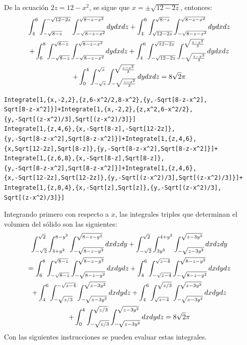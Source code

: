De la ecuación $2z=12-x^2 $, se sigue que $x=\pm \sqrt{12-2z}$,
entonces:
\begin{gather}
\int_{4}^{6}\int_{-\sqrt{8-z}}^{-\sqrt{12-2z}}\int_{-\sqrt{8-z-x^2}}^{\sqrt{8-z-x^2}}dydxdz +\int_{4}^{6}\int_{\sqrt{12-2z}}^{\sqrt{8-z}}\int_{-\sqrt{8-z-x^2}}^{\sqrt{8-z-x^2}}dydxdz \notag \\
+\int_{6}^{8}\int_{-\sqrt{8-z}}^{\sqrt{8-z}}\int_{-\sqrt{8-z-x^2}}^{\sqrt{8-z-x^2}}dydxdz + \int_{4}^{6}\int_{-\sqrt{12-2z}}^{\sqrt{12-2z}}\int_{-\sqrt{\frac{z-x^2 }{3}} }^{\sqrt{\frac{z-x^2 }{3}}}dydxdz \notag \\
+\int_{0}^{4}\int_{-\sqrt{z}}^{\sqrt{z}}\int_{-\sqrt{\frac{z-x^2 }{3}}}^{\sqrt{\frac{z-x^2 }{3}} }dydxdz = 8\sqrt{2}\pi
\end{gather}

\begin{tcolorbox}[title=\bf Instrucción en \verb"Mathematica"]\begin{Verbatim}[formatcom=\letraverbatim]
Integrate[1,{x,-2,2},{z,6-x^2/2,8-x^2},{y,-Sqrt[8-z-x^2],
Sqrt[8-z-x^2]}]+Integrate[1,{x,-2,2},{z,x^2,6-x^2/2},
{y,-Sqrt[(z-x^2)/3],Sqrt[(z-x^2)/3]}]
Integrate[1,{z,4,6},{x,-Sqrt[8-z],-Sqrt[12-2z]},
{y,-Sqrt[8-z-x^2],Sqrt[8-z-x^2]}]+Integrate[1,{z,4,6},
{x,Sqrt[12-2z],Sqrt[8-z]},{y,-Sqrt[8-z-x^2],Sqrt[8-z-x^2]}]+
Integrate[1,{z,6,8},{x,-Sqrt[8-z],Sqrt[8-z]},
{y,-Sqrt[8-z-x^2],Sqrt[8-z-x^2]}]+Integrate[1,{z,4,6},
{x,-Sqrt[12-2z],Sqrt[12-2z]},{y,-Sqrt[(z-x^2)/3],Sqrt[(z-x^2)/3]}]+
Integrate[1,{z,0,4},{x,-Sqrt[z],Sqrt[z]},{y,-Sqrt[(z-x^2)/3],
Sqrt[(z-x^2)/3]}]
\end{Verbatim}
\end{tcolorbox}

Integrando primero con respecto a $x$, las integrales triples que determinan el volumen del sólido son las siguientes:
\begin{gather}
\int_{-\sqrt{2}}^{\sqrt{2}}\int_{4+y^2 }^{8-y^2}\int_{-\sqrt{8-z-y^2}}^{\sqrt{8-z-y^2}}dxdzdy
+\int_{-\sqrt{2}}^{\sqrt{2}}\int_{3y^2 }^{4+y^2}\int_{-\sqrt{z-3y^2 } }^{\sqrt{z-3y^2}}dxdzdy \notag \\
= \int_{6}^{8}\int_{-\sqrt{8-z}}^{\sqrt{8-z}}\int_{-\sqrt{8-z-y^2 }}^{\sqrt{8-z-y^2}}dxdydz+\int_{4}^{6}\int_{-\sqrt{z-4}}^{\sqrt{z-4}}\int_{-\sqrt{8-z-y^2}}^{\sqrt{8-z-y^2 }}dxdydz \notag \\
+\int_{4}^{6}\int_{-\sqrt{z/3}}^{-\sqrt{z-4}}\int_{-\sqrt{z-3y^2}}^{\sqrt{z-3y^2}}dxdydz+\int_{4}^{6}\int_{\sqrt{z-4}}^{\sqrt{z/3}}\int_{-\sqrt{z-3y^2}}^{\sqrt{z-3y^2 }}dxdydz \notag \\
+\int_{0}^{4}\int_{-\sqrt{z/3}}^{\sqrt{z/3}}\int_{-\sqrt{z-3y^2 }}^{\sqrt{z-3y^2 } }dxdydz = 8\sqrt{2}\pi
\end{gather}
Con las siguientes instrucciones se pueden evaluar estas integrales.

